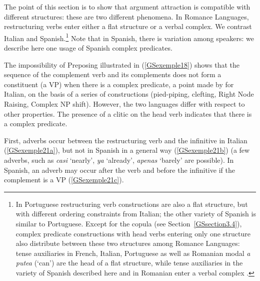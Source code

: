 \documentclass[output=paper
                ,modfonts
                ,nonflat
	        ,collection
	        ,collectionchapter
	        ,collectiontoclongg
 	        ,biblatex
                ,babelshorthands
                ,newtxmath
                ,draftmode
                ,colorlinks, citecolor=brown
]{./langsci/langscibook}
\begin{document}
{The point of this section is to show that argument attraction is compatible with different structures: these are two different phenomena. In Romance Languages, restructuring verbs enter either a flat structure or a verbal complex. We contrast Italian and Spanish.\footnote{In Portuguese restructuring verb constructions are also a flat structure, but with different ordering constraints from Italian; the other variety of Spanish is similar to Portuguese. Except for the copula (see Section~\ref{GSsection3.4}), complex predicate constructions with head verbs entering only one structure also distribute between these two structures among Romance Languages: tense auxiliaries in French, Italian, Portuguese as well as Romanian modal \emph{a putea} (`can') are the head of a flat structure, while tense auxiliaries in the variety of Spanish described here and in Romanian enter a verbal complex \citep{AG2010}.} Note that in Spanish, there is variation among speakers: we describe here one usage of Spanish complex predicates. 

The impossibility of Preposing illustrated in (\ref{GSexemple18}) shows that the sequence of the complement verb and its complements does not form a constituent (a VP) when there is a complex predicate, a point made by \cite{rizzi1982issues} for Italian, on the basis of a series of constructions (pied-piping, clefting, Right Node Raising, Complex NP shift). However, the two languages differ with respect to other properties. The presence of a clitic on the head verb indicates that there is a complex predicate.
 
First, adverbs occur between the restructuring verb and the infinitive in Italian (\ref{GSexemple21a}), but not in Spanish in a general way (\ref{GSexemple21b}) (a few adverbs, such as \emph{casi} `nearly', \emph{ya} `already', \emph{apenas} `barely' are possible). In Spanish, an adverb may occur after the verb and before the infinitive if the complement is a VP (\ref{GSexemple21c}).

\eal
	\label{GSexemple21} 
	\label{GSexemple21a}

	\label{GSexemple21b}		
	
}
\end{document}
